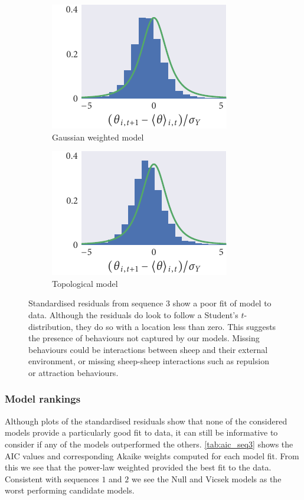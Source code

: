 \begin{figure}[tbp]
\begin{subfigure}[t]{0.33333\textwidth}
  \end{subfigure}%
  \begin{subfigure}[t]{0.33333\textwidth}
    \includegraphics{seq3/gauss_residuals.pdf}
    \caption{Gaussian weighted model}
  \end{subfigure}%
  \begin{subfigure}[t]{0.33333\textwidth}
    \includegraphics{seq3/top_residuals.pdf}
    \caption{Topological model}
  \end{subfigure}
  \caption{Standardised residuals from sequence $3$ show a poor fit of model to
    data. Although the residuals do look to follow a Student's $t$-distribution,
    they do so with a location less than zero. This suggests the presence of
    behaviours not captured by our models. Missing behaviours could be
    interactions between sheep and their external environment, or missing
    sheep-sheep interactions such as repulsion or attraction behaviours.}
  \label{fig:residuals_seq3}
\end{figure}

\subsubsection{Model rankings}

Although plots of the standardised residuals show that none of the considered
models provide a particularly good fit to data, it can still be informative to
consider if any of the models outperformed the others. \cref{tab:aic_seq3}
shows the AIC values and corresponding Akaike weights computed for each model
fit. From this we see that the power-law weighted provided the best fit to the
data. Consistent with sequences $1$ and $2$ we see the Null and Vicsek models
as the worst performing candidate models.

